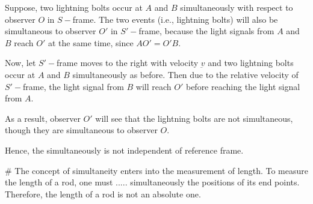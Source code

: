 \documentclass[../main-sheet.tex]{subfiles}
\begin{document}
Suppose, two lightning bolts occur at \(A \) and \(B \) simultaneously with respect to observer \(O \) in \(S-\)frame. The two events (i.e., lightning bolts) will also be simultaneous to observer \(O'\) in \(S'-\)frame, because the light signals from \(A \) and \(B \) reach \(O' \) at the same time, since \(AO'=O'B \).

Now, let \(S'-\)frame moves to the right with velocity \(\underbar{v } \) and two lightning bolts occur at \(A \) and \(B\) simultaneously as before. Then due to the relative velocity of \(S'-\)frame, the light signal from \(B \) will reach \(O'\) before reaching the light signal from \(A \).

As a result, observer \(O'\) will see that the lightning bolts are not simultaneous, though they are simultaneous to observer \(O \).

Hence, the simultaneously is not independent of reference frame.


\# The concept of simultaneity enters into the measurement of length. To measure the length of a rod, one must ..... simultaneously the positions of its end points. Therefore, the length of a rod is not an absolute one.
\end{document}
